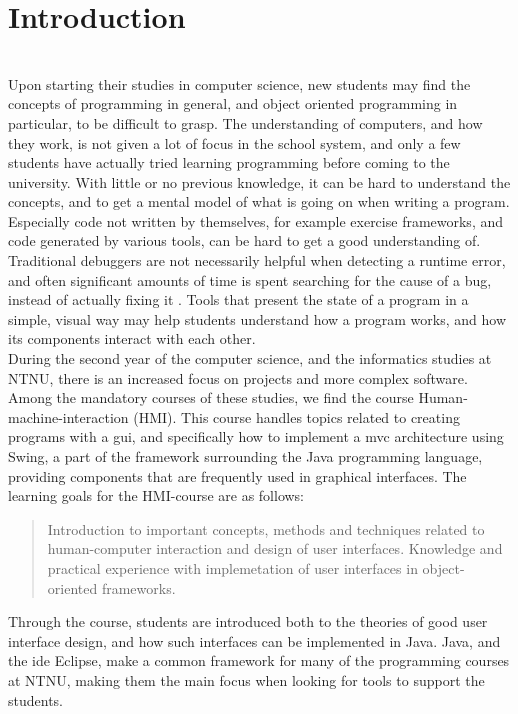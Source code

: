\chapter{Introduction}\label{introduction}
~\\
Upon starting their studies in computer science, new students may find the concepts of programming in general, and object oriented programming in particular, to be difficult to grasp.
The understanding of computers, and how they work, is not given a lot of focus in the school system, and only a few students have actually tried learning programming before coming to the university.%
With little or no previous knowledge, it can be hard to understand the concepts, and to get a mental model of what is going on when writing a program.
Especially code not written by themselves, for example exercise frameworks, and code generated by various tools, can be hard to get a good understanding of.
Traditional debuggers are not necessarily helpful when detecting a runtime error, and often significant amounts of time is spent searching for the cause of a bug, instead of actually fixing it \cite{ko2006}. %
Tools that present the state of a program in a simple, visual way may help students understand how a program works, and how its components interact with each other.
~\\

During the second year of the computer science, and the informatics studies at NTNU, there is an increased focus on projects and more complex software.
Among the mandatory courses of these studies, we find the course Human-machine-interaction (HMI).
This course handles topics related to creating programs with a \gls{gui}, and specifically how to implement a \gls{mvc} architecture using Swing, a part of the framework surrounding the Java programming language, providing components that are frequently used in graphical interfaces.
The learning goals for the HMI-course are as follows:
\begin{quotation}
Introduction to important concepts, methods and techniques related to human-computer interaction and design of user interfaces.
Knowledge and practical experience with implemetation of user interfaces in object-oriented frameworks.
\end{quotation}

Through the course, students are introduced both to the theories of good user interface design, and how such interfaces can be implemented in Java.
Java, and the \gls{ide} Eclipse, make a common framework for many of the programming courses at NTNU, making them the main focus when looking for tools to support the students.
~\\%


